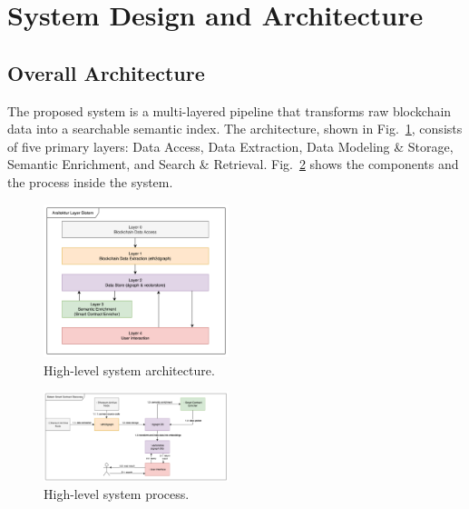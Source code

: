 \section{System Design and Architecture}\label{sec:system}

\subsection{Overall Architecture}
The proposed system is a multi-layered pipeline that transforms raw blockchain data into a searchable semantic index. The architecture, shown in Fig.~\ref{fig:architecture}, consists of five primary layers: Data Access, Data Extraction, Data Modeling \& Storage, Semantic Enrichment, and Search \& Retrieval. Fig.~\ref{fig:process} shows the components and the process inside the system.

\begin{figure}[htbp]
	\centerline{\includegraphics[width=0.48\textwidth]{resources/chapter-3/layer-arsitektur-new.png}}
	\caption{High-level system architecture.}\label{fig:architecture}
\end{figure}

\begin{figure}[htbp]
	\centerline{\includegraphics[width=0.48\textwidth]{resources/chapter-3/komponen-utama-new.png}}
	\caption{High-level system process.}\label{fig:process}
\end{figure}


